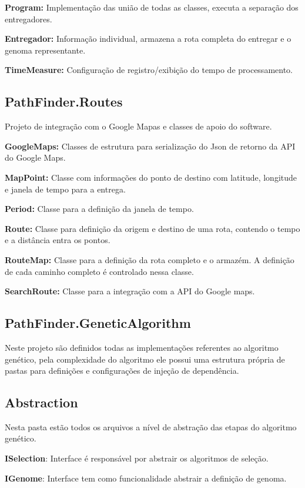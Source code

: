 \textbf{Program:} Implementação das união de todas as classes, executa a separação dos entregadores.

\textbf{Entregador:} Informação individual, armazena a rota completa do entregar e o genoma representante.

\textbf{TimeMeasure:} Configuração de registro/exibição do tempo de processamento.
\subsection{PathFinder.Routes}

Projeto de integração com o Google Mapas e classes de apoio do software.

\textbf{GoogleMaps:} Classes de estrutura para serialização do Json de retorno da API do Google Maps.

\textbf{MapPoint:} Classe com informações do ponto de destino com latitude, longitude e janela de tempo para a entrega.

\textbf{Period:} Classe para a definição da janela de tempo.

\textbf{Route:} Classe para definição da origem e destino de uma rota, contendo o tempo e a distância entra os pontos.

\textbf{RouteMap:} Classe para a definição da rota completo e o armazém. A definição de cada caminho completo é controlado nessa classe. 

\textbf{SearchRoute:} Classe para a integração com a API do Google maps.

\subsection{PathFinder.GeneticAlgorithm}
Neste projeto são definidos todas as implementações referentes ao algoritmo genético, pela complexidade do algoritmo ele possui uma estrutura própria de pastas para definições e configurações de injeção de dependência.

\subsection{Abstraction}

Nesta pasta estão todos os arquivos a nível de abstração das etapas do algoritmo genético.

\textbf{ISelection}: Interface é responsável por abstrair os algoritmos de seleção.

\textbf{IGenome}: Interface tem como funcionalidade abstrair a definição de genoma.

